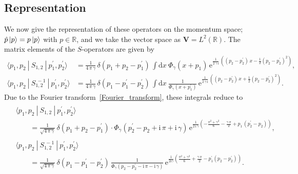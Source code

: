 \documentclass[12pt]{article}
\numberwithin{equation}{section}
\begin{document}
\subsection{Representation}
We now give  the  representation of these operators on the momentum
space;
$\Hat{p} \, |p \rangle = p \, | p \rangle$ with $p\in \mathbb{R}$,
and we take the vector space as
$\mathbf{V} = L^2(\mathbb{R})$.
The matrix elements  of the $S$-operators are  given by~\cite{Hikam00a}
\begin{subequations}
  \label{S_element}
\begin{align}
  \langle p_1, p_2 \ | \ S_{1, 2} \ | \ p_1^\prime , p_2^\prime \rangle
  & =
  \frac{1}{4 \, \pi \, \gamma} \,
  \delta(p_1 +  p_2 - p_1^\prime ) \,
  \int \mathrm{d} x \
  \Phi_\gamma(x+p_1) \,
  \mathrm{e}^{
    \frac{1}{2 \, \gamma \, \mathrm{i}} \,
    \left(
      (p_2 - p_2^\prime) \,   x
      -  \frac{1}{2}(p_2 -  p_2^\prime)^2
    \right)
    } ,
  \\[2mm]
%
  \langle p_1, p_2  \ | \ S_{1, 2}^{~-1} \ | \ p_1^\prime , p_2^\prime \rangle
  & =
  \frac{1}{4 \, \pi \, \gamma} \,
  \delta(p_1 -p_1^\prime - p_2^\prime ) \,
  \int \mathrm{d} x \
  \frac{1}{\Phi_\gamma(x+p_1^\prime)} \,
  \mathrm{e}^{
    \frac{1}{2 \, \gamma \, \mathrm{i}} \,
    \left(
      (p_2 - p_2^\prime) \,   x
      + \frac{1}{2}(p_2 -  p_2^\prime)^2
    \right)
    }  .
\end{align}
\end{subequations}
Due to the Fourier transform~\eqref{Fourier_transform}, these
integrals reduce to
\begin{subequations}
  \label{S_element_2}
  \begin{gather}
    \begin{split}
      & \langle p_1, p_2  \ | \ S_{1, 2}  \ | \ p_1^\prime , p_2^\prime \rangle
      \\
      &  \qquad =
      \frac{1}{\sqrt{4 \, \pi \, \gamma}} \,
      \delta(p_1 + p_2 - p_1^\prime) \cdot
      \Phi_\gamma(p_2^\prime - p_2
      + \mathrm{i} \, \pi + \mathrm{i} \, \gamma) \,
      \mathrm{e}^{\frac{1}{2 \, \mathrm{i} \, \gamma}
        \left(
          - \frac{\pi^2 + \gamma^2}{6} - \frac{\gamma \, \pi}{2}
          + p_1 \, (p_2^\prime - p_2)
        \right)
        } ,
    \end{split}
    \\[4mm]
%
    \begin{split}
      & \langle p_1, p_2 \ | \ S_{1, 2}^{~-1} \ | \ p_1^\prime , p_2^\prime
      \rangle
      \\
      &  \qquad =
      \frac{1}{\sqrt{4 \, \pi \, \gamma}} \,
      \delta(p_1 - p_1^\prime - p_2^\prime) \,
      \frac{1}{
        \Phi_\gamma(p_2 - p_2^\prime - \mathrm{i} \, \pi
        - \mathrm{i} \, \gamma)
        } \,
      \mathrm{e}^{
        \frac{1}{2 \mathrm{i} \gamma}
        \left(
        \frac{\pi^2 + \gamma^2}{6}
        + \frac{\gamma \, \pi}{2}
        - p_1^\prime ( p_2 - p_2^\prime)
        \right)
        } .
    \end{split}
  \end{gather}
\end{subequations}
\end{document}
